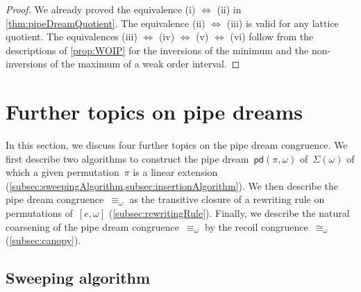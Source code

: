 \documentclass[reqno]{amsart}
\theoremstyle{definition}
\newcommand{\vincent}[1]{\todo[color=blue!30]{#1 \\ \hfill --- V.}}
\newcommand{\acyclicPipeDreams}{\Sigma} %
\newcommand{\linearExtensions}{\mathcal{L}} %
\newcommand{\insertion}[2]{\mathsf{pd}(#1,#2)} %
\begin{document}
\begin{proof}
We already proved the equivalence (i) $\Leftrightarrow$ (ii) in \cref{thm:pipeDreamQuotient}.
The equivalence (ii) $\Leftrightarrow$ (iii) is valid for any lattice quotient.
The equivalences (iii) $\Leftrightarrow$ (iv) $\Leftrightarrow$ (v) $\Leftrightarrow$ (vi) follow from the descriptions of \cref{prop:WOIP} for the inversions of the minimum and the non-inversions of the maximum of a weak order interval.
\end{proof}


\section{Further topics on pipe dreams}
\label{sec:furtherTopics}

In this section, we discuss four further topics on the pipe dream congruence.
We first describe two algorithms to construct the pipe dream~$\insertion{\pi}{\omega}$ of~$\acyclicPipeDreams(\omega)$ of which a given permutation~$\pi$ is a linear extension (\cref{subsec:sweepingAlgorithm,subsec:insertionAlgorithm}).
We then describe the pipe dream congruence~$\equiv_\omega$ as the transitive closure of a rewriting rule on permutations of~$[e, \omega]$ (\cref{subsec:rewritingRule}).
Finally, we describe the natural coarsening of the pipe dream congruence~$\equiv_\omega$ by the recoil congruence~$\cong_\omega$ (\cref{subsec:canopy}).



\subsection{Sweeping algorithm}
\label{subsec:sweepingAlgorithm}
\end{document}

